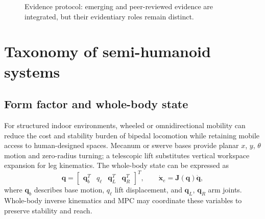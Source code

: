\documentclass[10pt,a4paper]{article}
\newcommand{\evidence}[1]{\par\noindent\footnotesize\color{gray}\emph{Evidence basis: #1}\normalsize\par}
\begin{document}
\begin{figure}[ht]
\centering
{}
\caption{Evidence protocol: emerging and peer-reviewed evidence are integrated, but their evidentiary roles remain distinct.}
\label{fig:method}
\end{figure}

\section{Taxonomy of semi-humanoid systems}
\subsection{Form factor and whole-body state}
For structured indoor environments, wheeled or omnidirectional mobility can reduce the cost and stability burden of bipedal locomotion while retaining mobile access to human-designed spaces. Mecanum or swerve bases provide planar $x$, $y$, $\theta$ motion and zero-radius turning; a telescopic lift substitutes vertical workspace expansion for leg kinematics. The whole-body state can be expressed as
\begin{equation}
\mathbf{q}=\begin{bmatrix}\mathbf{q}_{b}^{T} & q_{\ell} & \mathbf{q}_{L}^{T} & \mathbf{q}_{R}^{T}\end{bmatrix}^{T}, \qquad
\dot{\mathbf{x}}_e=\mathbf{J}(\mathbf{q})\dot{\mathbf{q}},
\label{eq:wbc}
\end{equation}
where $\mathbf{q}_b$ describes base motion, $q_{\ell}$ lift displacement, and $\mathbf{q}_L$, $\mathbf{q}_R$ arm joints. Whole-body inverse kinematics and MPC may coordinate these variables to preserve stability and reach.\cite{petrovic}
\end{document}
